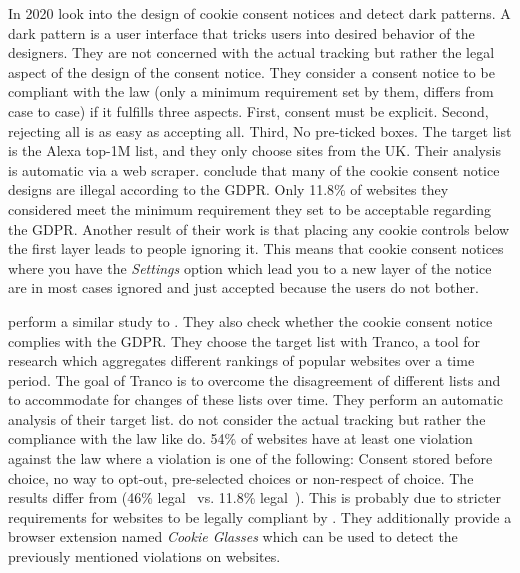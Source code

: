 In 2020  look into the design of cookie consent notices and detect dark patterns. A dark pattern is
a user interface that tricks users into desired behavior of the designers. They are not
concerned with the actual tracking but rather the legal aspect of the design of the consent notice. They consider a
consent notice to be compliant with the law (only a minimum requirement set by them, differs from case to case) if it
fulfills three aspects. First, consent must be explicit. Second, rejecting all is as easy as accepting all. Third, No
pre-ticked boxes. The target list is
the Alexa top-1M list, and they only choose sites from the UK. Their analysis is automatic via a web scraper.
\citeauthor{nouwens2020dark} conclude that many of the cookie consent notice designs are illegal according to the GDPR.
Only 11.8\% of websites they considered meet the minimum requirement they set to be acceptable regarding the GDPR.
Another result of their work is that placing any cookie controls below the first layer leads to people ignoring it. This
means that cookie consent notices where you have the \emph{Settings} option which lead you to a new layer of the notice
are in most cases ignored and just accepted because the users do not bother.

 perform a similar study to . They also check whether the cookie consent notice
complies with the GDPR. They choose the target list with Tranco, a tool for research which aggregates different rankings
of popular websites over a time period. The goal of Tranco is to overcome the disagreement of different lists and to accommodate
for changes of these lists over time. They perform an automatic analysis of their target list.
\citeauthor{matte2020cookie} do not consider the actual tracking but rather the compliance with the law
like \citeauthor{nouwens2020dark} do. 54\% of websites have at least one violation against the law where a violation is
one of the following: Consent stored before choice, no way to opt-out, pre-selected choices or non-respect of choice.
The results differ from \citeauthor{nouwens2020dark}(46\% legal~\cite{matte2020cookie} vs. 11.8\%
legal~\cite{nouwens2020dark}). This is probably due to stricter
requirements for websites to be legally compliant by \citeauthor{nouwens2020dark}.
They additionally provide a browser extension named \emph{Cookie Glasses} which can be used to detect the previously
mentioned violations on websites.

